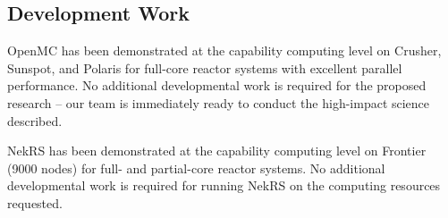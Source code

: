 

\vspace{-.25in}
\subsection{Development Work}
\vspace{-.15in}

OpenMC has been demonstrated at the capability computing level on Crusher, Sunspot, and Polaris
for full-core reactor systems with excellent parallel performance. 
No additional developmental work is required for the proposed research -- our
team is immediately ready to conduct the high-impact science described.

NekRS has been demonstrated at the capability computing level on Frontier
(9000 nodes) for full- and partial-core reactor systems.
No additional developmental work is required for running NekRS on
the computing resources requested.
